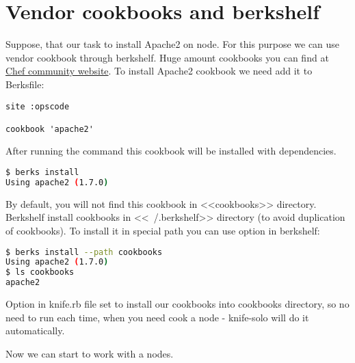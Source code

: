 \section{Vendor cookbooks and berkshelf}

Suppose, that our task to install Apache2 on node. For this purpose we can use vendor cookbook through berkshelf. Huge amount cookbooks you can find at \href{http://community.opscode.com/cookbooks}{Chef community website}. To install Apache2 cookbook we need add it to Berksfile:

\begin{lstlisting}[label=lst:my-cloud-berkshelf1,title=my-cloud/Berksfile]
site :opscode

cookbook 'apache2'
\end{lstlisting}

After running the command  this cookbook will be installed with dependencies.

\begin{lstlisting}[language=Bash,label=lst:my-cloud-berkshelf2]
$ berks install
Using apache2 (1.7.0)
\end{lstlisting}

By default, you will not find this cookbook in <<cookbooks>> directory. Berkshelf install cookbooks in <<~/.berkshelf>> directory (to avoid duplication of cookbooks). To install it in special path you can use  option in berkshelf:

\begin{lstlisting}[language=Bash,label=lst:my-cloud-berkshelf3]
$ berks install --path cookbooks
Using apache2 (1.7.0)
$ ls cookbooks
apache2
\end{lstlisting}

Option  in knife.rb file set to install our cookbooks into cookbooks directory, so no need to run  each time, when you need cook a node - knife-solo will do it automatically.

Now we can start to work with a nodes.
